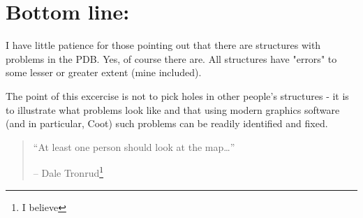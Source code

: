 \documentclass{article}
\begin{document}



\section*{Bottom line:}

I have little patience for those pointing out that there are
structures with problems in the PDB. Yes, of course there are. All
structures have "errors" to some lesser or greater extent (mine
included).

The point of this excercise is not to pick holes in other people's
structures - it is to illustrate what problems look like and that
using modern graphics software (and in particular, Coot) such problems
can be readily identified and fixed.


\begin{quotation}
  ``At least one person should look at the map\ldots'' 

  -- Dale Tronrud\footnote{I believe}
\end{quotation}
\end{document}
